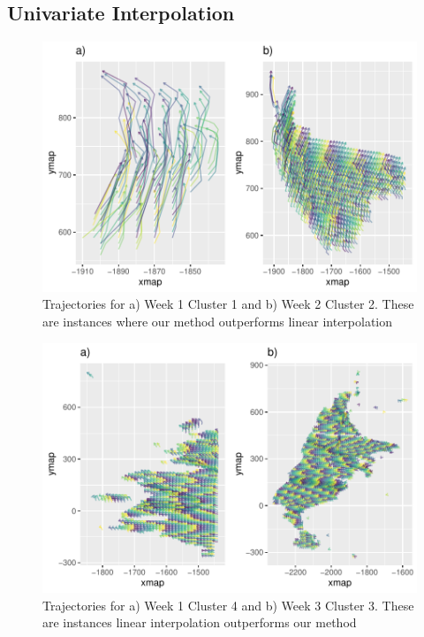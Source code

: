 \documentclass[12pt]{article}
\begin{document}
\hypertarget{univariate-interpolation-1}{%
\subsection{Univariate Interpolation}\label{univariate-interpolation-1}}

\begin{figure}[tbp]

{\centering \includegraphics[width=\linewidth,]{spatio-temporal-model-arctic-sea-ice_files/figure-latex/int-best-plots-1} 

}

\caption[Clusters for Intersection Model has lowest MSE]{Trajectories for a) Week 1 Cluster 1 and b) Week 2 Cluster 2. These are instances where our method outperforms linear interpolation}\label{fig:int-best-plots}
\end{figure}

\begin{figure}[tbp]

{\centering \includegraphics[width=\linewidth,]{spatio-temporal-model-arctic-sea-ice_files/figure-latex/lin-best-plots-1} 

}

\caption[Clusters for Linear Interpolation has lowest MSE]{Trajectories for a) Week 1 Cluster 4 and b) Week 3 Cluster 3. These are instances linear interpolation outperforms our method}\label{fig:lin-best-plots}
\end{figure}
\end{document}

